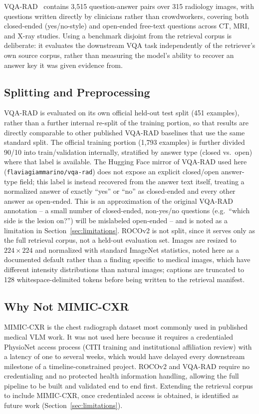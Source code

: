 VQA-RAD~\cite{lau2018vqarad} contains 3{,}515 question-answer pairs over 315
radiology images, with questions written directly by clinicians rather than
crowdworkers, covering both closed-ended (yes/no-style) and open-ended
free-text questions across CT, MRI, and X-ray studies. Using a benchmark
disjoint from the retrieval corpus is deliberate: it evaluates the
downstream VQA task independently of the retriever's own source corpus,
rather than measuring the model's ability to recover an answer key it was
given evidence from.

\subsection{Splitting and Preprocessing}

VQA-RAD is evaluated on its own official held-out test split (451
examples), rather than a further internal re-split of the training
portion, so that results are directly comparable to other published
VQA-RAD baselines that use the same standard split. The official
training portion (1{,}793 examples) is further divided 90/10 into
train/validation internally, stratified by answer type (closed
vs.\ open) where that label is available. The Hugging Face mirror of
VQA-RAD used here (\texttt{flaviagiammarino/vqa-rad}) does not expose
an explicit closed/open answer-type field; this label is instead
recovered from the answer text itself, treating a normalized answer of
exactly ``yes'' or ``no'' as closed-ended and every other answer as
open-ended. This is an approximation of the original VQA-RAD
annotation -- a small number of closed-ended, non-yes/no questions
(e.g.\ ``which side is the lesion on?'') will be mislabeled
open-ended -- and is noted as a limitation in
Section~\ref{sec:limitations}. ROCOv2 is not split, since it serves
only as the full retrieval corpus, not a held-out evaluation set.
Images are resized to $224\times224$ and normalized with standard
ImageNet statistics, noted here as a documented default rather than a
finding specific to medical images, which have different intensity
distributions than natural images; captions are truncated to 128
whitespace-delimited tokens before being written to the retrieval
manifest.

\subsection{Why Not MIMIC-CXR}

MIMIC-CXR is the chest radiograph dataset most commonly used in published
medical VLM work. It was not used here because it requires a credentialed
PhysioNet access process (CITI training and institutional affiliation
review) with a latency of one to several weeks, which would have delayed
every downstream milestone of a timeline-constrained project. ROCOv2 and
VQA-RAD require no credentialing and no protected health information
handling, allowing the full pipeline to be built and validated end to end
first. Extending the retrieval corpus to include MIMIC-CXR, once
credentialed access is obtained, is identified as future work
(Section~\ref{sec:limitations}).
